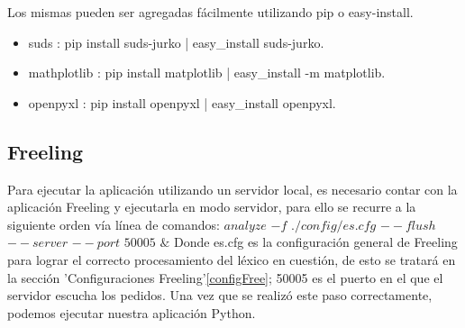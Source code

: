 \documentclass[12pt]{article}
\begin{document}
Los mismas pueden ser agregadas fácilmente utilizando pip o easy-install.
\begin{itemize}
  \item suds : pip install suds-jurko | easy\_install suds-jurko.
  \item mathplotlib : pip install matplotlib | easy\_install -m matplotlib.
  \item openpyxl : pip install openpyxl | easy\_install openpyxl.
\end{itemize}


\subsection{Freeling}\label{free}
Para ejecutar la aplicación utilizando un servidor local, es necesario contar con la aplicación Freeling y ejecutarla en modo servidor, para ello se recurre a la siguiente orden vía línea de comandos:
$analyze$ $-f$ $./config/es.cfg$ $--flush$ $--server$ $--port$ $50005$ $\&$
Donde es.cfg es la configuración general de Freeling para lograr el correcto procesamiento del léxico en cuestión, de esto se tratará en la sección 'Configuraciones Freeling'\ref{configFree}; 50005 es el puerto en el que el servidor escucha los pedidos.
Una vez que se realizó este paso correctamente, podemos ejecutar nuestra aplicación Python. 
\end{document}
